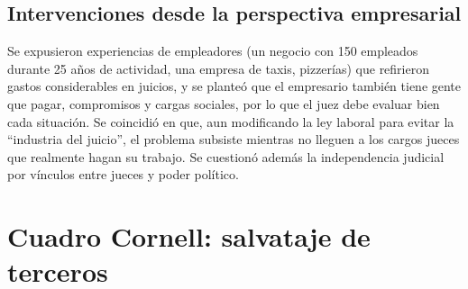 \documentclass[12pt,oneside]{book}
\begin{document}
\subsection{Intervenciones desde la perspectiva empresarial}

Se expusieron experiencias de empleadores (un negocio con 150 empleados durante 25 años de actividad, una empresa de taxis, pizzerías) que refirieron gastos considerables en juicios, y se planteó que el empresario también tiene gente que pagar, compromisos y cargas sociales, por lo que el juez debe evaluar bien cada situación. Se coincidió en que, aun modificando la ley laboral para evitar la ``industria del juicio'', el problema subsiste mientras no lleguen a los cargos jueces que realmente hagan su trabajo. Se cuestionó además la independencia judicial por vínculos entre jueces y poder político.

\section{Cuadro Cornell: salvataje de terceros}
\end{document}

